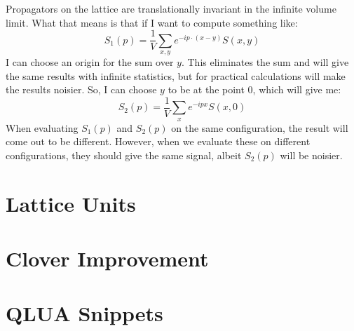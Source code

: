 \documentclass[11pt, oneside]{article}   	%
\theoremstyle{definition}
\begin{document}
Propagators on the lattice are translationally invariant in the infinite volume limit. What that means is that if I want to compute 
something like:
\begin{equation}
	S_1(p) = \frac{1}{V}\sum_{x, y}e^{-ip\cdot (x - y)} S(x, y)
\end{equation}
I can choose an origin for the sum over $y$. This eliminates the sum and will give the same results with infinite statistics, 
but for practical calculations will make the results noisier. So, I can choose $y$ to be at the point $0$, which will give me:
\begin{equation}
	S_2(p) = \frac{1}{V}\sum_x e^{-ipx} S(x, 0)
\end{equation}
When evaluating $S_1(p)$ and $S_2(p)$ on the same configuration, the result will come out to be different. However, when 
we evaluate these on different configurations, they should give the same signal, albeit $S_2(p)$ will be noisier. 

\section{Lattice Units}

\section{Clover Improvement}

\section{QLUA Snippets}
\end{document}

